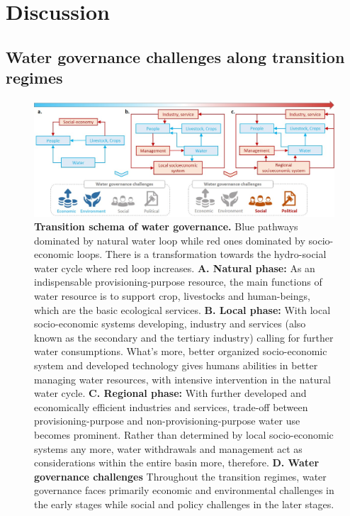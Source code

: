 \documentclass[9pt, twocolumn, twoside, lineno]{pnas-new}
\begin{document}
\section*{Discussion}
\label{Discussion}

\subsection*{Water governance challenges along transition regimes}

\begin{figure}[htbp!]
	\centering
	\includegraphics[width=\linewidth]{../../figures/main/transition.jpg}
	\caption{
		\textbf{Transition schema of water governance.} Blue pathways dominated by natural water loop while red ones dominated by socio-economic loops. There is a transformation towards the hydro-social water cycle where red loop increases.
		\textbf{A. Natural phase:} As an indispensable provisioning-purpose resource, the main functions of water resource is to support crop, livestocks and human-beings, which are the basic ecological services.
		\textbf{B. Local phase:} With local socio-economic systems developing, industry and services (also known as the secondary and the tertiary industry) calling for further water consumptions. What's more, better organized socio-economic system and developed technology gives humans abilities in better managing water resources, with intensive intervention in the natural water cycle. 
		\textbf{C. Regional phase:} With further developed and economically efficient industries and services, trade-off between provisioning-purpose and non-provisioning-purpose water use becomes prominent. Rather than determined by local socio-economic systems any more, water withdrawals and management act as considerations within the entire basin more, therefore. 
		\textbf{D. Water governance challenges} Throughout the transition regimes, water governance faces primarily economic and environmental challenges in the early stages while social and policy challenges in the later stages.
	}
	\label{fig:summary}
\end{figure}
\end{document}
